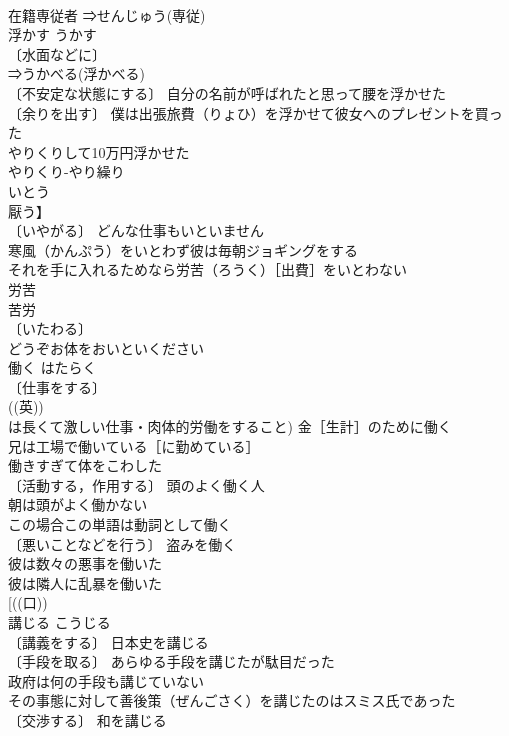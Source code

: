 \documentclass[8pt]{extreport}
\begin{document}
\begin{CJK}{UTF8}{min}
\\	在籍専従者 ⇒せんじゅう(専従)
\\	浮かす	うかす	
\\	〔水面などに〕
\\	⇒うかべる(浮かべる)
\\	〔不安定な状態にする〕 自分の名前が呼ばれたと思って腰を浮かせた 
\\	〔余りを出す〕 僕は出張旅費（りょひ）を浮かせて彼女へのプレゼントを買った 
\\	やりくりして10万円浮かせた 
\\	やりくり-やり繰り 
\\	いとう	
\\	厭う】	
\\	〔いやがる〕 どんな仕事もいといません 
\\	寒風（かんぷう）をいとわず彼は毎朝ジョギングをする 
\\	それを手に入れるためなら労苦（ろうく）［出費］をいとわない
\\	労苦　
\\	苦労　
\\	〔いたわる〕　
\\	どうぞお体をおいといください 
\\	働く	はたらく	
\\	〔仕事をする〕
\\	((英)) 
\\	は長くて激しい仕事・肉体的労働をすること) 金［生計］のために働く 
\\	兄は工場で働いている［に勤めている］ 
\\	働きすぎて体をこわした 
\\	〔活動する，作用する〕 頭のよく働く人 
\\	朝は頭がよく働かない 
\\	この場合この単語は動詞として働く 
\\	〔悪いことなどを行う〕 盗みを働く 
\\	彼は数々の悪事を働いた 
\\	彼は隣人に乱暴を働いた 
\\	[((口)) 
\\	講じる	こうじる	
\\	〔講義をする〕 日本史を講じる 
\\	〔手段を取る〕 あらゆる手段を講じたが駄目だった 
\\	政府は何の手段も講じていない 
\\	その事態に対して善後策（ぜんごさく）を講じたのはスミス氏であった 
\\	〔交渉する〕 和を講じる 

\end{CJK}
\end{document}
